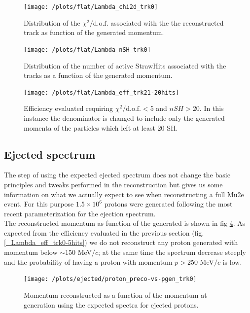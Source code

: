 \documentclass[12pt,a4paper,openright, oneside, titlepage]{book} %
\begin{document}
\begin{figure}[!htb]
\centering
\texttt{[image: /plots/flat/Lambda\_chi2d\_trk0]}
\caption{Distribution of the $\chi^2/\textrm{d.o.f.}$ associated with the the reconstructed track as function of the generated momentum.}
\label{_Lambda_chi2d_trk0}
\end{figure}

\begin{figure}[!htb]
\centering
\texttt{[image: /plots/flat/Lambda\_nSH\_trk0]}
\caption{Distribution of the number of active StrawHits associated with the tracks as a function of the generated momentum.}
\label{_Lambda_nSH_trk0}
\end{figure}

\begin{figure}[!htb]
\centering
\texttt{[image: /plots/flat/Lambda\_eff\_trk21-20hits]}
\caption{Efficiency evaluated requiring $\chi^2/\textrm{d.o.f.}<5$ and $nSH>20$. In this instance the denominator is changed to include only the generated momenta of the particles which left at least 20 SH.}
\label{_Lambda_eff_trk21-20hits}
\end{figure}

\subsection{Ejected spectrum}
The step of using the expected ejected spectrum does not change the basic principles and tweaks performed in the reconstruction but gives us some information on what we actually expect to see when reconstructing a full Mu2e event. 
For this purpose $1.5\times10^6$ protons were generated following the most recent parameterization for the ejection spectrum.\\
The reconstructed momentum as function of the generated is shown in fig \ref{_proton_preco-vs-pgen_trk0}. 
As expected from the efficiency evaluated in the previous section (fig. \ref{_Lambda_eff_trk0-5hits}) we do not reconstruct any proton generated with momentum below $\sim 150$ MeV$/c$; at the same time the spectrum decrease steeply and the probability of having a proton with momentum $p > 250$ MeV$/c$ is low.

\begin{figure}[!htb]
\centering
\texttt{[image: /plots/ejected/proton\_preco-vs-pgen\_trk0]}
\caption{Momentum reconstructed as a function of the momentum at generation using the expected spectra for ejected protons.}
\label{_proton_preco-vs-pgen_trk0}
\end{figure}
\end{document}
